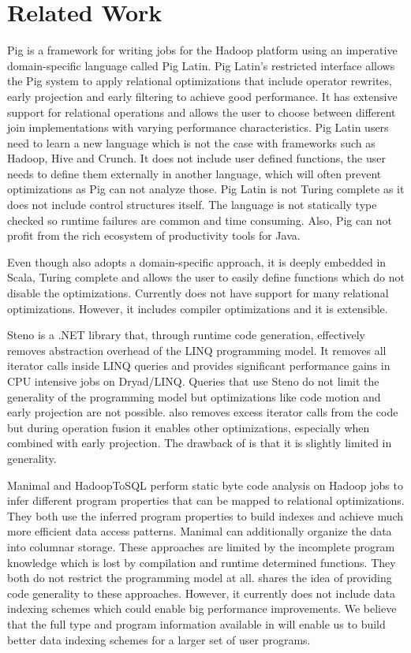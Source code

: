 \section{Related Work}
\label{sec:related-work}

Pig \cite{olston_pig_2008-1} is a framework for writing jobs for the Hadoop
platform using an imperative domain-specific language called Pig Latin. Pig
Latin's restricted interface allows the Pig system to apply relational
optimizations that include operator rewrites, early projection and early
filtering to achieve good performance.
It has extensive support for relational operations and allows the user to choose
between different join implementations with varying performance characteristics.
Pig Latin users need to learn a new language which is not the case with
frameworks such as Hadoop, Hive and Crunch. It does not include user defined
functions, the user needs to define them externally in another language, which
will often prevent optimizations as Pig can not analyze those. Pig Latin is not
Turing complete as it does not include control structures itself.
The language is not statically type checked so runtime failures are common and
time consuming. Also, Pig can not profit from the rich ecosystem
of productivity tools for Java.

Even though \tool also adopts a domain-specific approach, it is deeply embedded
in Scala, Turing complete and allows the user to easily define functions which
do not disable the optimizations. Currently \tool does not have support for many
relational optimizations. However, it includes compiler optimizations and it is
extensible.

Steno \cite{murray_steno:_2011} is a .NET library that, through runtime code
generation, effectively removes abstraction overhead of the LINQ programming
model. It removes all iterator calls inside LINQ queries and provides
significant performance gains in CPU intensive jobs on Dryad/LINQ. Queries that
use Steno do not limit the generality of the programming model but optimizations
like code motion and early projection are not possible.
\tool also removes excess iterator calls from the code but during operation
fusion it enables other optimizations, especially when combined with early
projection. The drawback of \tool is that it is slightly limited in generality.

Manimal \cite{jahani_automatic_2011} and HadoopToSQL \cite{iu_hadooptosql:_2010}
perform static byte code analysis on Hadoop jobs to infer different program
properties that can be mapped to relational optimizations. They both use the
inferred program properties to build indexes and achieve much more efficient
data access patterns. Manimal can additionally organize the data into columnar
storage. These approaches are limited by the incomplete program knowledge which
is lost by compilation and runtime determined functions. They both do not
restrict the programming model at all.
\tool shares the idea of providing code generality to these approaches. However,
it currently does not include data indexing schemes which could enable big
performance improvements. We believe that the full type and program information
available in \tool will enable us to build better data indexing schemes for a
larger set of user programs.
